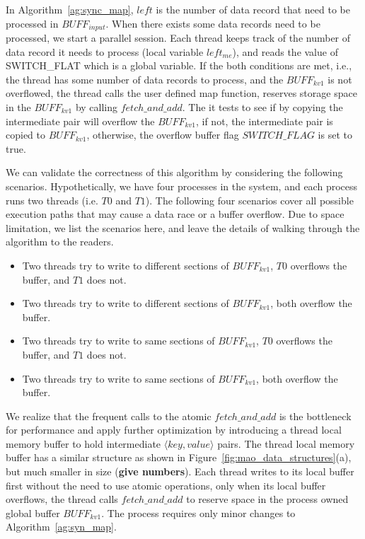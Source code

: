 In Algorithm~\ref{ag:sync_map}, $left$ is the number of data record
that need to be processed in $BUFF_{input}$. When there exists 
some data records need to be processed, we start a parallel session.
Each thread keeps track of the number of data record it needs to
process (local variable $left_{me}$), and reads the value of SWITCH\_FLAT
which is a global variable. If the both conditions are met, i.e., the
thread has some number of data records to process, and the
$BUFF_{kv1}$ is not overflowed, the thread calls the user
defined map function, reserves storage space in the $BUFF_{kv1}$
by calling $fetch\_and\_add$. The it tests to see if by copying 
the intermediate pair will overflow the $BUFF_{kv1}$, if not,
the intermediate pair is copied to $BUFF_{kv1}$, otherwise,
the overflow buffer flag $SWITCH\_FLAG$ is set to true.

We can validate the correctness of this algorithm by considering
the following scenarios. Hypothetically, we have four processes
in the system, and each process runs two threads (i.e. $T0$ and $T1$). The following 
four scenarios cover all possible execution paths that may
cause a data race or a buffer overflow. Due to space limitation,
we list the scenarios here, and leave the details of walking through 
the algorithm to the readers.

\begin{itemize}
\item Two threads try to write to different sections of $BUFF_{kv1}$,
$T0$ overflows the buffer, and $T1$ does not.
\item Two threads try to write to different sections of $BUFF_{kv1}$,
both overflow the buffer.
\item Two threads try to write to same sections of $BUFF_{kv1}$,
$T0$ overflows the buffer, and $T1$ does not.
\item Two threads try to write to same sections of $BUFF_{kv1}$,
both overflow the buffer.
\end{itemize}

We realize that the frequent calls to the atomic
$fetch\_and\_add$ is the bottleneck for performance and apply
further optimization by introducing a thread local memory
buffer to hold intermediate $\langle key, value \rangle$ pairs.
The thread local memory buffer has a similar structure as
shown in Figure~\ref{fig:mao_data_structures}(a), but much
smaller in size (\textbf{give numbers}). Each thread writes
to its local buffer first without the need to use atomic
operations, only when its local buffer overflows, the thread
calls $fetch\_and\_add$ to reserve space in the process 
owned global buffer $BUFF_{kv1}$. The process requires 
only minor changes to Algorithm~\ref{ag:syn_map}. 

